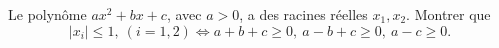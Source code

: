Le polynôme $ax^2 + bx + c$, avec $a > 0$, a des racines réelles $x_1, x_2$. Montrer que
\[ |x_i| \leq 1,\ (i = 1, 2) \Leftrightarrow a + b + c \geq 0,\ a - b + c \geq 0,\ a - c \geq 0. \]
